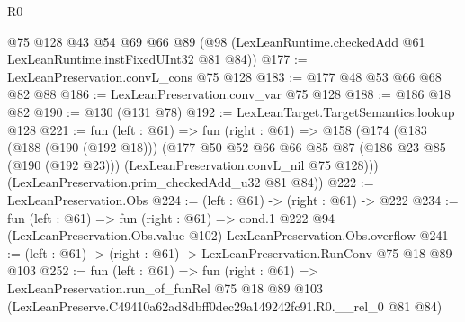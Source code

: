 \begin{lexlean}{R0}
\begin{coremodule}
    @75
    @128
    @43
    @54
    @69
    @66
    @89
    (@98 (LexLeanRuntime.checkedAdd @61 LexLeanRuntime.instFixedUInt32 @81 @84))
@177 := LexLeanPreservation.convL_cons @75 @128
@183 := @177 @48 @53 @66 @68 @82 @88
@186 := LexLeanPreservation.conv_var @75 @128
@188 := @186 @18 @82
@190 := @130 (@131 @78)
@192 := LexLeanTarget.TargetSemantics.lookup @128
@221 := fun (left : @61) =>
  fun (right : @61) =>
  @158
    (@174
      (@183
        (@188 (@190 (@192 @18)))
        (@177
          @50
          @52
          @66
          @66
          @85
          @87
          (@186 @23 @85 (@190 (@192 @23)))
          (LexLeanPreservation.convL_nil @75 @128)))
      (LexLeanPreservation.prim_checkedAdd_u32 @81 @84))
@222 := LexLeanPreservation.Obs
@224 := (left : @61) -> (right : @61) -> @222
@234 := fun (left : @61) =>
  fun (right : @61) =>
  cond.{1} @222 @94 (LexLeanPreservation.Obs.value @102) LexLeanPreservation.Obs.overflow
@241 := (left : @61) -> (right : @61) -> LexLeanPreservation.RunConv @75 @18 @89 @103
@252 := fun (left : @61) =>
  fun (right : @61) =>
  LexLeanPreservation.run_of_funRel
    @75
    @18
    @89
    @103
    (LexLeanPreserve.C49410a62ad8dbff0dec29a149242fc91.R0.__rel_0 @81 @84)
\end{coremodule}
\end{lexlean}
